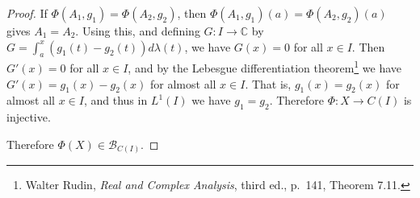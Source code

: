 \documentclass{article}
\theoremstyle{definition}
\begin{document}
\begin{proof}
If $\Phi(A_1,g_1)=\Phi(A_2,g_2)$, then $\Phi(A_1,g_1)(a)=\Phi(A_2,g_2)(a)$ gives $A_1=A_2$. Using this, and defining
$G:I \to \mathbb{C}$ by
$G=\int_a^x (g_1(t)-g_2(t)) d\lambda(t)$, we have
$G(x)=0$   for all $x \in I$. Then $G'(x)=0$ for all $x \in I$, and by the Lebesgue differentiation theorem\footnote{Walter Rudin,
{\em Real and Complex Analysis}, third ed., p.~141, Theorem 7.11.} we have $G'(x)=g_1(x)-g_2(x)$ for almost all $x \in I$. That is,
$g_1(x)=g_2(x)$ for almost all $x \in I$, and thus in $L^1(I)$ we have $g_1=g_2$. 
Therefore $\Phi:X \to C(I)$ is injective. 

Therefore $\Phi(X) \in \mathscr{B}_{C(I)}$.
\end{proof}
\end{document}
